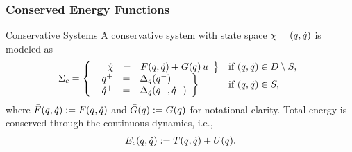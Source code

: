 \begin{frame}[t]
  \frametitle{Conserved Energy Functions}
   {
    \begin{block}{Conservative Systems}
      A conservative system with state space $\chi = (q, \dot q)$ is modeled as
      \begin{align*}
        \bar{\Sigma}_{c} = \left\{
          \begin{array}{l l}
            \left.\begin{array}{r c l}
                \hspace{.58em}{\dot {\chi}} &=& {\bar {F}}(q, \dot q) + {\bar {G}}(q) \, u
              \end{array}\right\}  & \mbox{if } (q, \dot q) \in D \setminus S,\\
            \left. \begin{array}{r c l}
                q^{+} &=& \Delta_{q}(q^{-})\\
                \dot q^{+} &=& \Delta_{\dot q}(q^{-}, \dot q^{-})
              \end{array} \right\} & \mbox{if } (q, \dot q) \in S,
          \end{array}\right.
      \end{align*}
      where ${\bar {F}}(q, \dot q) := F(q, \dot q)$ and ${\bar {G}}(q) := G(q)$ for
      notational clarity. Total energy is conserved through the continuous
      dynamics, i.e.,
      \begin{align*}
        E_{c}(q, \dot q) := T(q, \dot q) + U(q).
      \end{align*}
    \end{block}
  }


\end{frame}
